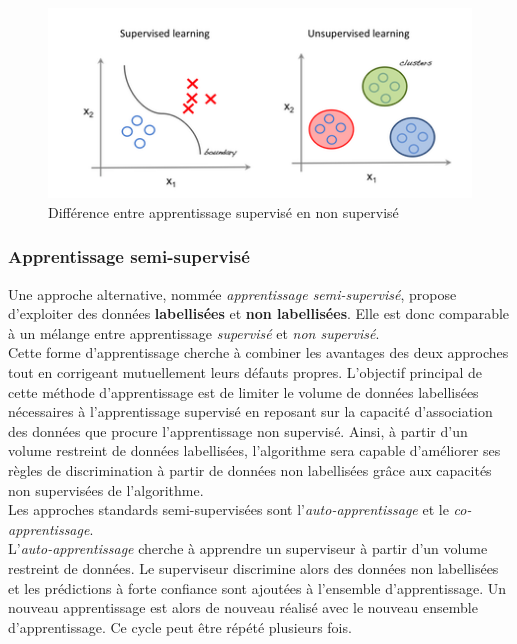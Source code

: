 \begin{figure}
    \centering
    \includegraphics[scale=0.5]{./tex/induction/unsuper.png}
    \caption{Différence entre apprentissage supervisé en non supervisé}
    \label{super_unsuper}
\end{figure}


\subsubsection{Apprentissage semi-supervisé}

\noindent Une approche alternative, nommée \textit{apprentissage semi-supervisé}, propose d'exploiter des données \textbf{labellisées} et \textbf{non labellisées}. Elle est donc comparable à un mélange entre apprentissage \textit{supervisé} et \textit{non supervisé}. \\

\noindent Cette forme d'apprentissage cherche à combiner les avantages des deux approches tout en corrigeant mutuellement leurs défauts propres. L'objectif principal de cette méthode d'apprentissage est de limiter le volume de données labellisées nécessaires à l'apprentissage supervisé en reposant sur la capacité d'association des données que procure l'apprentissage non supervisé. Ainsi, à partir d'un volume restreint de données labellisées, l'algorithme sera capable d'améliorer ses règles de discrimination à partir de données non labellisées grâce aux capacités non supervisées de l'algorithme.\\

\noindent Les approches standards semi-supervisées sont l'\textit{auto-apprentissage} et le \textit{co-apprentissage}.\\

\noindent L'\textit{auto-apprentissage} cherche à apprendre un superviseur à partir d'un volume restreint de données. Le superviseur discrimine alors des données non labellisées et les prédictions à forte confiance sont ajoutées à l'ensemble d'apprentissage. Un nouveau apprentissage est alors de nouveau réalisé avec le nouveau ensemble d'apprentissage. Ce cycle peut être répété plusieurs fois.\\

